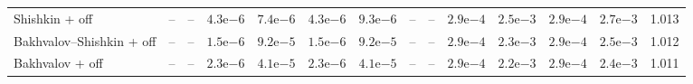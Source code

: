 \begin{table}[!htbp]
{\begin{tabular}{l rrrrrr rrrrrr r}
Shishkin + off & -- & -- & $4.3\mathrm{e}{-6}$ & $7.4\mathrm{e}{-6}$ & $4.3\mathrm{e}{-6}$ & $9.3\mathrm{e}{-6}$ & -- & -- & $2.9\mathrm{e}{-4}$ & $2.5\mathrm{e}{-3}$ & $2.9\mathrm{e}{-4}$ & $2.7\mathrm{e}{-3}$ & 1.013 \\
Bakhvalov--Shishkin + off & -- & -- & $1.5\mathrm{e}{-6}$ & $9.2\mathrm{e}{-5}$ & $1.5\mathrm{e}{-6}$ & $9.2\mathrm{e}{-5}$ & -- & -- & $2.9\mathrm{e}{-4}$ & $2.3\mathrm{e}{-3}$ & $2.9\mathrm{e}{-4}$ & $2.5\mathrm{e}{-3}$ & 1.012 \\
Bakhvalov + off & -- & -- & $2.3\mathrm{e}{-6}$ & $4.1\mathrm{e}{-5}$ & $2.3\mathrm{e}{-6}$ & $4.1\mathrm{e}{-5}$ & -- & -- & $2.9\mathrm{e}{-4}$ & $2.2\mathrm{e}{-3}$ & $2.9\mathrm{e}{-4}$ & $2.4\mathrm{e}{-3}$ & 1.011 \\
\bottomrule
\end{tabular}}
\end{table}

